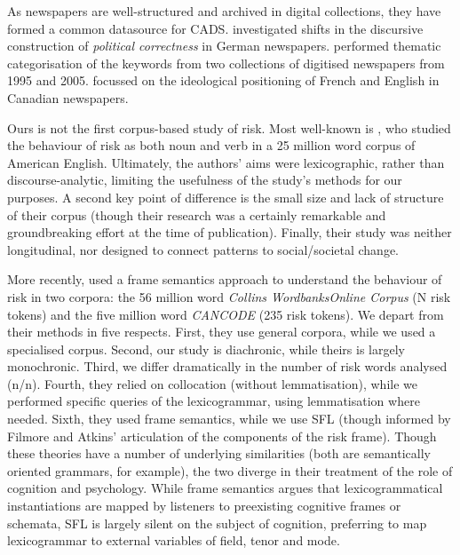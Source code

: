 		\noindent As newspapers are well-structured and archived in digital collections, they have formed a common datasource for CADS.  investigated shifts in the discursive construction of \emph{political correctness} in German newspapers.  performed thematic categorisation of the keywords from two collections of digitised newspapers from 1995 and 2005.  focussed on the ideological positioning of French and English in Canadian newspapers. %

		Ours is not the first corpus-based study of risk. Most well-known is , who studied the behaviour of risk as both noun and verb in a 25 million word corpus of American English. Ultimately, the authors' aims were lexicographic, rather than discourse-analytic, limiting the usefulness of the study's methods for our purposes. A second key point of difference is the small size and lack of structure of their corpus (though their research was a certainly remarkable and groundbreaking effort at the time of publication). Finally, their study was neither longitudinal, nor designed to connect patterns to social/societal change.

		More recently,  used a frame semantics approach to understand the behaviour of risk in two corpora: the 56 million word \emph{Collins WordbanksOnline Corpus} (N risk tokens) and the five million word \emph{CANCODE} (235 risk tokens). 
		We depart from their methods in five respects. First, they use general corpora, while we used a specialised corpus. Second, our study is diachronic, while theirs is largely monochronic. Third, we differ dramatically in the number of risk words analysed (n/n). Fourth, they relied on collocation (without lemmatisation), while we performed specific queries of the lexicogrammar, using lemmatisation where needed. Sixth, they used frame semantics, while we use SFL (though informed by Filmore and Atkins' \citeyear{fillmore_toward_1992} articulation of the components of the risk frame). Though these theories have a number of underlying similarities (both are semantically oriented grammars, for example), the two diverge in their treatment of the role of cognition and psychology. While frame semantics argues that lexicogrammatical instantiations are mapped by listeners to preexisting cognitive frames or schemata, SFL is largely silent on the subject of cognition, preferring to map lexicogrammar to external variables of field, tenor and mode.

